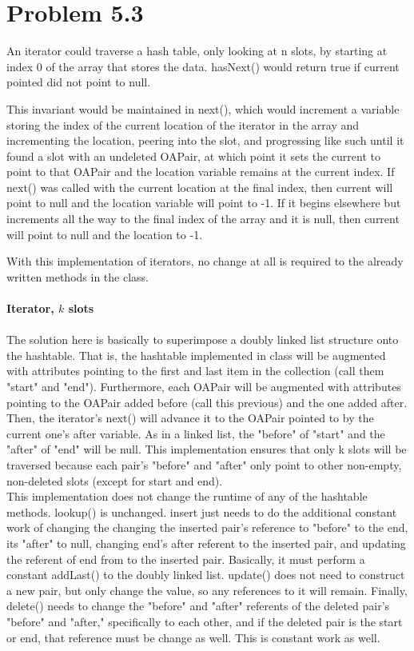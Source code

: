 \documentclass[12pt,letterpaper]{article}
\newcommand\hwnum{5}                  %
\newenvironment{answer}[3]{
  \section*{Problem \hwnum.#1}
}{\newpage}
\begin{document}
\begin{answer}{3}


\textbf{Iterator, $n$ slots}

An iterator could traverse a hash table, only looking at n slots, by starting at index 0 of the array that stores the data. hasNext() would return true if current pointed did not point to null. 

This invariant would be maintained in next(), which would increment a variable storing the index of the current location of the iterator in the array and incrementing the location, peering into the slot, and progressing like such until it found a slot with an undeleted OAPair, at which point it sets the current to point to that OAPair and the location variable remains at the current index. If next() was called with the current location at the final index, then current will point to null and the location variable will point to -1. If it begins elsewhere but increments all the way to the final index of the array and it is null, then current will point to null and the location to -1.

With this implementation of iterators, no change at all is required to the already written methods in the class.\\\\

\textbf{Iterator, $k$ slots} \\\\
The solution here is basically to superimpose a doubly linked list structure onto the hashtable. That is, the hashtable implemented in class will be augmented with attributes pointing to the first and last item in the collection (call them "start" and "end"). Furthermore, each OAPair will be augmented with attributes pointing to the OAPair added before (call this previous) and the one added after. Then, the iterator's next() will advance it to the OAPair pointed to by the current one's after variable. As in a linked list, the "before" of "start" and the "after" of "end" will be null. This implementation ensures that only k slots will be traversed because each pair's "before" and "after" only point to other non-empty, non-deleted slots (except for start and end).\\

This implementation does not change the runtime of any of the hashtable methods. lookup() is unchanged. insert just needs to do the additional constant work of changing the changing the inserted pair's reference to "before" to the end, its "after" to null, changing end's after referent to the inserted pair, and updating the referent of end from to the inserted pair. Basically, it must perform a constant addLast() to the doubly linked list. update() does not need to construct a new pair, but only change the value, so any references to it will remain. Finally, delete() needs to change the "before" and "after" referents of the deleted pair's "before" and "after," specifically to each other, and if the deleted pair is the start or end, that reference must be change as well. This is constant work as well.\\\\


\end{answer}
\end{document}

